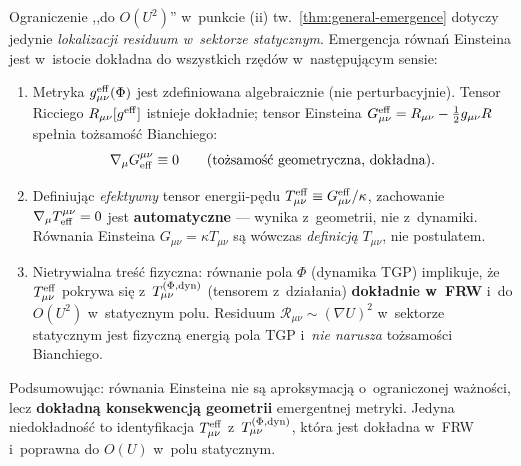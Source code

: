 \begin{remark}%
\label{rem:bianchi-all-orders}
Ograniczenie ,,do $O(U^2)$'' w~punkcie (ii) tw.~\ref{thm:general-emergence}
dotyczy jedynie \emph{lokalizacji residuum w~sektorze statycznym}.
Emergencja r\'owna\'n Einsteina jest w~istocie dok\l{}adna
do wszystkich rz\k{e}d\'ow w~nast\k{e}puj\k{a}cym sensie:

\begin{enumerate}[nosep]
  \item Metryka $g_{\mu\nu}^{\rm eff}(\Phi)$ jest zdefiniowana algebraicznie
    (nie perturbacyjnie). Tensor Ricciego $R_{\mu\nu}[g^{\rm eff}]$
    istnieje dok\l{}adnie; tensor Einsteina
    $G_{\mu\nu}^{\rm eff} = R_{\mu\nu} - \frac{1}{2}g_{\mu\nu}R$
    spe\l{}nia to\.zsamo\'s\'c Bianchiego:
    \begin{equation}\label{eq:bianchi-exact}
      \nabla_\mu G^{\mu\nu}_{\rm eff} \equiv 0
      \qquad\text{(to\.zsamo\'s\'c geometryczna, dok\l{}adna).}
    \end{equation}

  \item Definiuj\k{a}c \emph{efektywny} tensor energii-p\k{e}du
    $T_{\mu\nu}^{\rm eff} \equiv G_{\mu\nu}^{\rm eff}/\kappa$,
    zachowanie $\nabla_\mu T^{\mu\nu}_{\rm eff} = 0$ jest
    \textbf{automatyczne} --- wynika z~geometrii, nie z~dynamiki.
    R\'ownania Einsteina $G_{\mu\nu} = \kappa T_{\mu\nu}$ s\k{a} wówczas
    \emph{definicj\k{a}} $T_{\mu\nu}$, nie postulatem.

  \item Nietrywialna tre\'s\'c fizyczna: r\'ownanie pola $\Phi$
    (dynamika TGP) implikuje, \.ze $T_{\mu\nu}^{\rm eff}$ pokrywa si\k{e}
    z~$T_{\mu\nu}^{(\Phi,\rm dyn)}$ (tensorem z~dzia\l{}ania)
    \textbf{dok\l{}adnie w~FRW} i~do $O(U^2)$ w~statycznym polu.
    Residuum $\mathcal{R}_{\mu\nu} \sim (\nabla U)^2$ w~sektorze
    statycznym jest fizyczn\k{a} energi\k{a} pola TGP
    i~\emph{nie narusza} to\.zsamo\'sci Bianchiego.
\end{enumerate}

Podsumowuj\k{a}c: r\'ownania Einsteina nie s\k{a} aproksymacj\k{a}
o~ograniczonej wa\.zno\'sci, lecz \textbf{dok\l{}adn\k{a}
konsekwencj\k{a} geometrii} emergentnej metryki.
Jedyna niedok\l{}adno\'s\'c to identyfikacja $T_{\mu\nu}^{\rm eff}$
z~$T_{\mu\nu}^{(\Phi,\rm dyn)}$, kt\'ora jest dok\l{}adna w~FRW
i~poprawna do $O(U)$ w~polu statycznym.
\end{remark}

